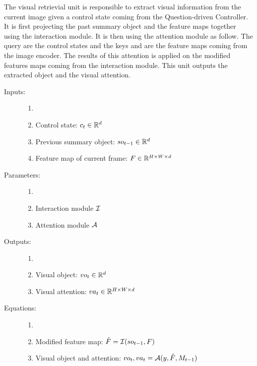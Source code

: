 
The visual retrievial unit is responsible to extract visual information from the current image given a control state coming from the Question-driven Controller. It is first projecting the past summary object and the feature maps together using the interaction module.
It is then using the attention module as follow. The query are the control states and the keys and are the feature maps coming from the image encoder. The results of this attention is applied on the modified features maps coming from the interaction module.  
This unit outputs the extracted object and the visual attention.

\begin{description}
	\item[Inputs:] 
	\begin{enumerate}
		\item[]
		\item Control state: $c_t \in \mathbb{R}^d$	
		\item Previous summary object: $so_{t-1} \in \mathbb{R}^d$
		\item Feature map of current frame: $F \in \mathbb{R}^{H \times W \times d}$
	\end{enumerate}
	
	\item[Parameters:] 
	\begin{enumerate}
		\item[]
		\item Interaction module $\mathcal{I}$
		\item Attention module $\mathcal{A}$
	\end{enumerate}
	
	\item[Outputs:] 
	\begin{enumerate}
		\item[]
		\item Visual object: $vo_t \in  \mathbb{R}^d$
		\item Visual attention: $va_t  \in \mathbb{R}^{H \times W \times d}$
	\end{enumerate}

	\item[Equations:]
	\begin{enumerate}
		\item[]
		\item Modified feature map: $\hat{F} = \mathcal{I}(so_{t-1}, F)$
		\item Visual object and attention: $vo_t, va_t = \mathcal{A}(y, \hat{F}, M_{t-1})$
	\end{enumerate}
\end{description}

